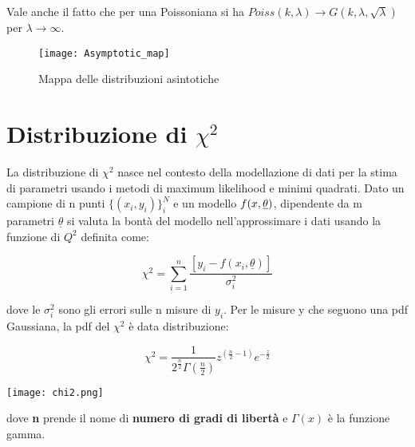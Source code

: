 Vale anche il fatto che per una Poissoniana si ha $Poiss(k,\lambda) \rightarrow G(k,\lambda, \sqrt{\lambda})$ per $\lambda \rightarrow \infty $.

 
\begin{figure}[!ht]
\vspace{0.2in}
\texttt{[image: Asymptotic\_map]}	
\centering
\vspace{0.2in}
\caption{Mappa delle distribuzioni asintotiche}
\end{figure}


\section{Distribuzione di $\chi^2$}


La distribuzione di $\chi^2$ nasce nel contesto della modellazione di dati per la stima di parametri usando i metodi di maximum likelihood e minimi quadrati. Dato un campione di n punti $\{(x_i,y_i)\}_{i}^N$ e un modello $f(x, \bold{\underline{\theta}})$, dipendente da m parametri $\underline{\theta}$ si valuta la bont\`{a} del modello nell'approssimare i dati usando la funzione di $Q^2$ definita come:

\begin{equation}
	\chi^2 = \sum_{i=1}^{n}\dfrac{[y_i - f(x_i,\underline{\theta})]}{\sigma^2_i}
\end{equation}

dove le $\sigma^2_i$ sono gli errori sulle n misure di $y_i$. 
\newline
Per le misure y che seguono una pdf Gaussiana, la pdf del $\chi^2$ \`{e} data distribuzione:


\vspace{0.3in}

  \begin{minipage}{0.5\textwidth}
\begin{equation*}
	\chi^2 = \dfrac{1}{2^{\frac{n}{2}}\Gamma(\frac{n}{2})}z^{(\frac{n}{2}-1)}e^{-\frac{z}{2}}
\end{equation*}
  \end{minipage}
  \begin{minipage}{.4\textwidth}
    \centering
    \texttt{[image: chi2.png]}

  \end{minipage}
\vspace{0.3in}

dove \textbf{n} prende il nome di \textbf{numero di gradi di libert\`{a}} e $\Gamma(x)$ \`{e} la funzione gamma.

